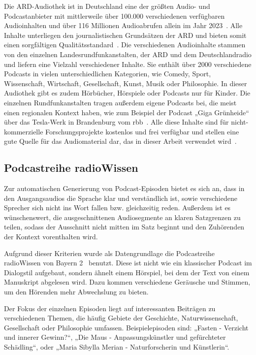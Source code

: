 Die ARD-Audiothek ist in Deutschland eine der größten Audio- und Podcastanbieter mit mittlerweile über 100.000 verschiedenen verfügbaren Audioinhalten und über 116 Millionen Audioabrufen allein im Jahr 2023~\cite{2024a}.
Alle Inhalte unterliegen den journalistischen Grundsätzen der ARD und bieten somit einen sorgfältigen Qualitätsstandard~\cite{2024b}.
Die verschiedenen Audioinhalte stammen von den einzelnen Landesrundfunkanstalten, der ARD und dem Deutschlandradio und liefern eine Vielzahl verschiedener Inhalte.
Sie enthält über 2000 verschiedene Podcasts in vielen unterschiedlichen Kategorien, wie Comedy, Sport, Wissenschaft, Wirtschaft, Gesellschaft, Kunst, Musik oder Philosophie.
In dieser Audiothek gibt es zudem Hörbücher, Hörspiele oder Podcasts nur für Kinder.
Die einzelnen Rundfunkanstalten tragen außerdem eigene Podcasts bei, die meist einen regionalen Kontext haben, wie zum Beispiel der Podcast „Giga Grünheide“ über das Tesla-Werk in Brandenburg vom rbb~\cite{zotero-523}.
Alle diese Inhalte sind für nicht-kommerzielle Forschungsprojekte kostenlos und frei verfügbar und stellen eine gute Quelle für das Audiomaterial dar, das in dieser Arbeit verwendet wird~\cite{zotero-525}.

\subsection{Podcastreihe radioWissen}

Zur automatischen Generierung von Podcast-Episoden bietet es sich an, dass in den Ausgangsaudios die Sprache klar und verständlich ist, sowie verschiedene Sprecher sich nicht ins Wort fallen bzw. gleichzeitig reden.
Außerdem ist es wünschenswert, die ausgeschnittenen Audiosegmente an klaren Satzgrenzen zu teilen, sodass der Ausschnitt nicht mitten im Satz beginnt und den Zuhörenden der Kontext vorenthalten wird.

Aufgrund dieser Kriterien wurde als Datengrundlage die Podcastreihe radioWissen von Bayern 2~\cite{zotero-527} benutzt.
Diese ist nicht wie ein klassischer Podcast im Dialogstil aufgebaut, sondern ähnelt einem Hörspiel, bei dem der Text von einem Manuskript abgelesen wird.
Dazu kommen verschiedene Geräusche und Stimmen, um den Hörenden mehr Abwechslung zu bieten.

Der Fokus der einzelnen Episoden liegt auf interessanten Beiträgen zu verschiedenen Themen, die häufig Gebiete der Geschichte, Naturwissenschaft, Gesellschaft oder Philosophie umfassen.
Beispielepisoden sind: „Fasten - Verzicht und innerer Gewinn?“, „Die Maus - Anpassungskünstler und gefürchteter Schädling“, oder „Maria Sibylla Merian - Naturforscherin und Künstlerin“.~\cite{zotero-527}

